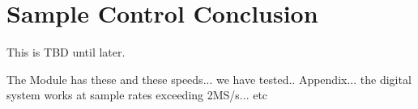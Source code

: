 \section{Sample Control Conclusion} \label{subsec:SampleControlConclusion} 

This is TBD until later.

The Module has these and these speeds... we have tested.. Appendix... the digital system works at sample rates exceeding 2MS/s... etc